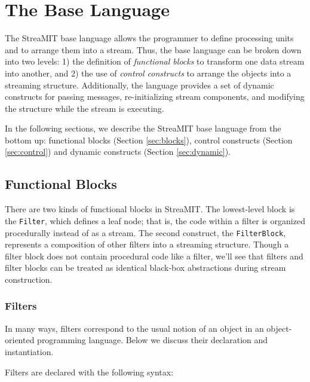 \documentclass[draft]{article}
\begin{document}
\section{The Base Language}

The StreaMIT base language allows the programmer to define processing
units and to arrange them into a stream.  Thus, the base language can
be broken down into two levels: 1) the definition of {\it functional
blocks} to transform one data stream into another, and 2) the use of
{\it control constructs} to arrange the objects into a streaming
structure.  Additionally, the language provides a set of dynamic
constructs for passing messages, re-initializing stream components,
and modifying the structure while the stream is executing.

In the following sections, we describe the StreaMIT base language from
the bottom up: functional blocks (Section \ref{sec:blocks}), control
constructs (Section \ref{sec:control}) and dynamic constructs (Section
\ref{sec:dynamic}).

\subsection{Functional Blocks}
\protect\label{sec:blocks}

There are two kinds of functional blocks in StreaMIT.  The
lowest-level block is the {\tt Filter}, which defines a leaf node;
that is, the code within a filter is organized procedurally instead of
as a stream.  The second construct, the {\tt FilterBlock}, represents
a composition of other filters into a streaming structure.  Though a
filter block does not contain procedural code like a filter, we'll see
that filters and filter blocks can be treated as identical black-box
abstractions during stream construction.

\subsubsection{Filters}

In many ways, filters correspond to the usual notion of an object in
an object-oriented programming language.  Below we discuss their
declaration and instantiation.

\medskip
{}
\medskip

Filters are declared with the following syntax:
\end{document}
